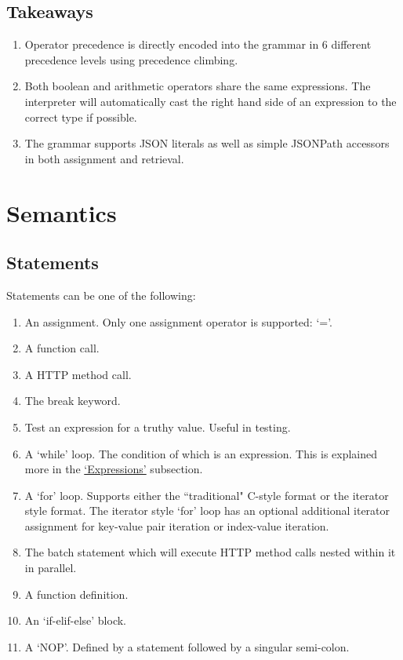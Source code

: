 \documentclass[]{interim}
\theoremstyle{definition}
\begin{document}
\subsection{Takeaways}

\begin{enumerate}
    \item Operator precedence is directly encoded into the grammar in 6 different precedence levels using precedence climbing.
    \item Both boolean and arithmetic operators share the same expressions. The interpreter will automatically cast the right hand side of an expression to the correct type if possible.
    \item The grammar supports JSON literals as well as simple JSONPath\textsuperscript{\cite{goessner_2007}} accessors in both assignment and retrieval.
\end{enumerate}

\pagebreak

\section{Semantics}

\subsection{Statements}

Statements can be one of the following:

\begin{center}
    \begin{enumerate}
        \item An assignment. Only one assignment operator is supported: `='.
        \item A function call.
        \item A HTTP method call.
        \item The break keyword.
        \item Test an expression for a truthy value. Useful in testing.
        \item A `while' loop. The condition of which is an expression. This is explained more in the \hyperref[sec:expressions]{`Expressions'} subsection.
        \item A `for' loop. Supports either the ``traditional" C-style format or the iterator style format. The iterator style `for' loop has an optional additional iterator assignment for key-value pair iteration or index-value iteration.
        \item The batch statement which will execute HTTP method calls nested within it in parallel.
        \item A function definition.
        \item An `if-elif-else' block.
        \item A `NOP'. Defined by a statement followed by a singular semi-colon.
    \end{enumerate}
\end{center}
\end{document}
